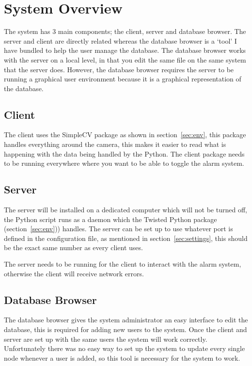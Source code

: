 \documentclass[a4paper]{article}
\begin{document}
\section{System Overview}
The system has 3 main components; the client, server and database browser. The server and client are directly related
whereas the database browser is a `tool' I have bundled to help the user manage the database. The database browser works
with the server on a local level, in that you edit the same file on the same system that the server does. However,
the database browser requires the server to be running a graphical user environment because it is a graphical representation
of the database. 

    \subsection{Client}
    The client uses the SimpleCV package as shown in section~\ref{sec:env}, this package handles everything around the camera,
    this makes it easier to read what is happening with the data being handled by the Python. The client package needs to be
    running everywhere where you want to be able to toggle the alarm system. 

    \subsection{Server}
    The server will be installed on a dedicated computer which will not be turned off, the Python script runs as a daemon
    which the Twisted Python package (section~\ref{sec:env})) handles. The server can be set up to use whatever port is defined
    in the configuration file, as mentioned in section~\ref{sec:settings}, this should be the exact same number as every client
    uses.

    The server needs to be running for the client to interact with the alarm system, otherwise the client will receive network
    errors.

    \subsection{Database Browser}
    The database browser gives the system administrator an easy interface to edit the database, this is required for
    adding new users to the system. Once the client and server are set up with the same users the system will work
    correctly. Unfortunately there was no easy way to set up the system to update every single node whenever a user is
    added, so this tool is necessary for the system to work.
\end{document}
